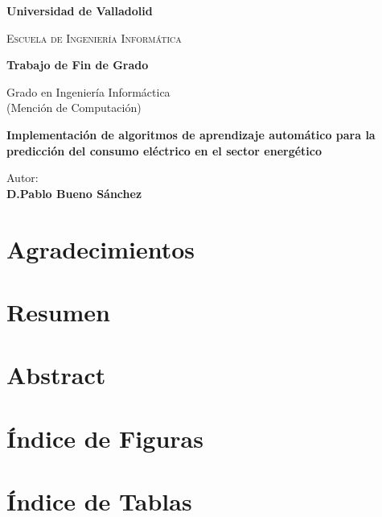 \documentclass[a4paper,12pt]{article}
\begin{document}
\begin{titlepage}
    \centering
    {\bfseries\Large Universidad de Valladolid \par}
    \vspace{2cm}
    {\scshape\Huge Escuela de Ingeniería Informática \par}
    {\bfseries\Large Trabajo de Fin de Grado \par}
    \vspace{2cm}
    {\Large Grado en Ingeniería Informáctica 
    \\ (Mención de Computación) \par}
    \vspace{2.5cm}
    {\bfseries\Huge Implementación de algoritmos de aprendizaje automático para la
    predicción del consumo eléctrico en el sector energético \par}
    \vspace{2cm}
    \raggedleft
    {Autor: \\
    \bfseries D.Pablo Bueno Sánchez}
\end{titlepage}

\tableofcontents

\newpage

\section*{Agradecimientos}

\newpage

\section*{Resumen}

\newpage

\section*{Abstract}

\section*{Índice de Figuras}

\newpage

\section{Índice de Tablas}
\end{document}
